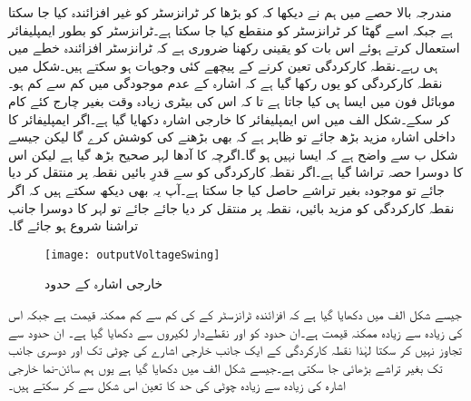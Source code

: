 مندرجہ بالا حصے میں ہم نے دیکھا کہ  کو بڑھا کر ٹرانزسٹر کو غیر افزائندہ کیا جا سکتا ہے جبکہ اسے گھٹا کر ٹرانزسٹر کو منقطع کیا جا سکتا ہے۔ٹرانزسٹر کو بطور ایمپلیفائر استعمال کرتے ہوئے اس بات کو یقینی رکھنا ضروری ہے کہ ٹرانزسٹر افزائندہ خطے میں ہی رہے۔نقطہ کارکردگی تعین کرنے کے پیچھے کئی وجوہات ہو سکتے ہیں۔شکل   میں نقطہ کارکردگی کو یوں رکھا گیا ہے کہ اشارہ کے عدم موجودگی میں  کم سے کم ہو۔موبائل فون میں ایسا ہی کیا جاتا ہے تا کہ اس کی بیٹری زیادہ وقت بغیر چارج کئے کام کر سکے۔شکل  الف   میں اس ایمپلیفائر کا خارجی اشارہ  دکھایا گیا ہے۔اگر ایمپلیفائر کا داخلی اشارہ  مزید بڑھ جائے تو ظاہر ہے کہ   بھی بڑھنے کی کوشش کرے گا لیکن جیسے شکل  ب سے واضح ہے کہ ایسا نہیں ہو گا۔اگرچہ  کا آدھا لہر  صحیح بڑھ گیا ہے لیکن اس کا دوسرا حصہ تراشا گیا ہے۔اگر نقطہ کارکردگی کو  سے قدرِ بائیں نقطہ    پر منتقل کر دیا جائے تو موجودہ  بغیر تراشے حاصل کیا جا سکتا ہے۔آپ یہ بھی دیکھ سکتے ہیں کہ اگر نقطہ کارکردگی کو مزید بائیں،  نقطہ  پر  منتقل کر دیا جائے جائے تو  لہر کا دوسرا جانب تراشنا شروع ہو جائے گا۔
\begin{figure}
\centering
\texttt{[image: outputVoltageSwing]}
\caption{خارجی اشارہ کے حدود}
\label{شکل_خارجی_اشارہ_کے_حدود}
\end{figure}
جیسے شکل  الف میں دکھایا گیا ہے کہ افزائندہ ٹرانزسٹر کے  کی کم سے کم ممکنہ قیمت  ہے جبکہ اس کی زیادہ سے زیادہ ممکنہ قیمت  ہے۔ان حدود کو  اور  نقطےدار لکیروں سے دکھایا گیا ہے۔  ان حدود سے تجاوز نہیں کر سکتا لہٰذا نقطہ کارکردگی  کے ایک جانب خارجی اشارے کی چوٹی   تک اور دوسری جانب  تک بغیر تراشے بڑھائی جا سکتی ہے۔جیسے شکل  الف   میں دکھایا گیا ہے یوں ہم سائن-نما خارجی اشارہ  کی زیادہ سے زیادہ چوٹی کی حد کا تعین اس شکل سے کر سکتے ہیں۔ 

